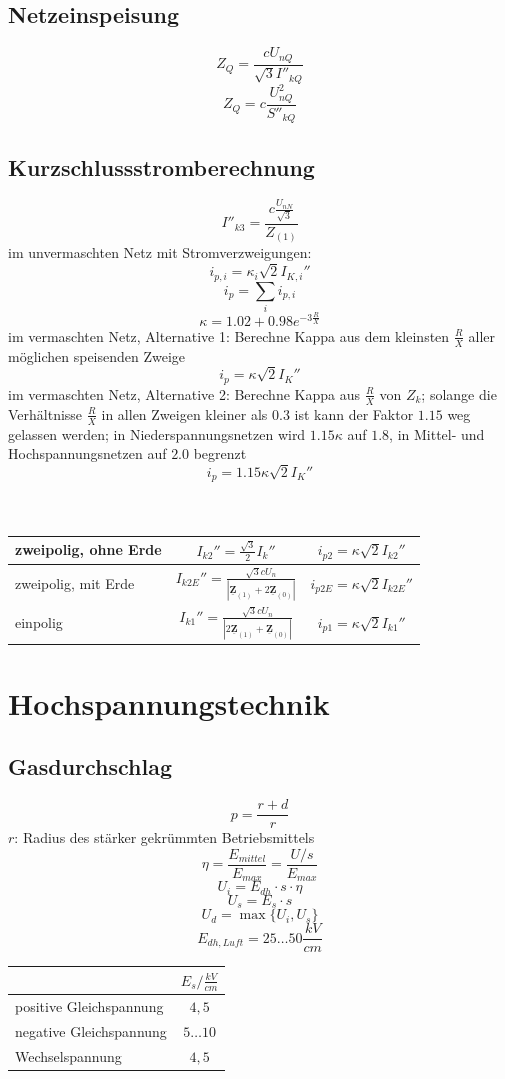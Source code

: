 \documentclass[9pt,a4paper]{scrartcl}
\renewcommand{\vec}[1]{\ensuremath{\underline{\boldsymbol {#1}}}}
\begin{document}
\begin{multicols}{3}
		\subsection{Netzeinspeisung}
		\[Z_Q = \frac{c U_{nQ}}{\sqrt{3} I''_{kQ}}\]
		\[Z_Q = c \frac{U_{nQ}^2}{S''_{kQ}}\]
		
		\subsection{Kurzschlussstromberechnung}
		\[I''_{k3} = \frac{c \frac{U_{nN}}{\sqrt 3}}{Z_{(1)}}\]
		im unvermaschten Netz mit Stromverzweigungen:
		\[i_{p,i} = \kappa_i \sqrt 2 I_{K,i}''\]
		\[i_p = \sum_i i_{p,i}\]
		\[\kappa = 1.02 + 0.98 e^{-3 \frac{R}{X}}\]
		im vermaschten Netz, Alternative 1: Berechne Kappa aus dem kleinsten $\frac{R}{X}$ aller möglichen speisenden Zweige
		\[i_p = \kappa \sqrt 2 I_K''\]
		im vermaschten Netz, Alternative 2: Berechne Kappa aus $\frac{R}{X}$ von $Z_k$; solange die Verhältnisse $\frac{R}{X}$ in allen Zweigen kleiner als $0.3$ ist kann der Faktor $1.15$ weg gelassen werden; in Niederspannungsnetzen wird $1.15 \kappa$ auf $1.8$, in Mittel- und Hochspannungsnetzen auf $2.0$ begrenzt
		\[i_p = 1.15 \kappa \sqrt 2 I_K''\]\\
		\\
		\begin{tabular}{l|c|c}
		zweipolig, ohne Erde & $I_{k2}'' = \frac{\sqrt{3}}{2} I_k''$ & $i_{p2} = \kappa \sqrt{2} I_{k2}''$ \\ \hline
		zweipolig, mit Erde & $I_{k2E}'' = \frac{\sqrt{3} c U_n}{|\vec Z_{(1)} + 2 \vec Z_{(0)}|}$ & $i_{p2E} = \kappa \sqrt{2} I_{k2E}''$ \\ \hline
		einpolig & $I_{k1}'' = \frac{\sqrt{3} c U_n}{|2 \vec Z_{(1)} + \vec Z_{(0)}|}$ & $i_{p1} = \kappa \sqrt{2} I_{k1}''$
		\end{tabular}

	\section{Hochspannungstechnik}
		\subsection{Gasdurchschlag}
		\[p = \frac{r + d}{r}\]
		$r$: Radius des stärker gekrümmten Betriebsmittels
		\[\eta = \frac{E_{mittel}}{E_{max}} = \frac{U/s}{E_{max}}\]
		\[U_i = E_{dh} \cdot s \cdot \eta\]
		\[U_s = E_s \cdot s\]
		\[U_d = \max\{U_i, U_s\}\]
		\[E_{dh,Luft} = 25 \hdots 50 \frac{kV}{cm}\]
		\begin{tabular}{l|c}
		 & $E_s / \frac{kV}{cm}$ \\ \hline
		 positive Gleichspannung & $4,5$ \\ \hline
		 negative Gleichspannung & $5 \hdots 10$ \\ \hline
		 Wechselspannung & $4,5$
		\end{tabular}
		

\end{multicols}
\end{document}
